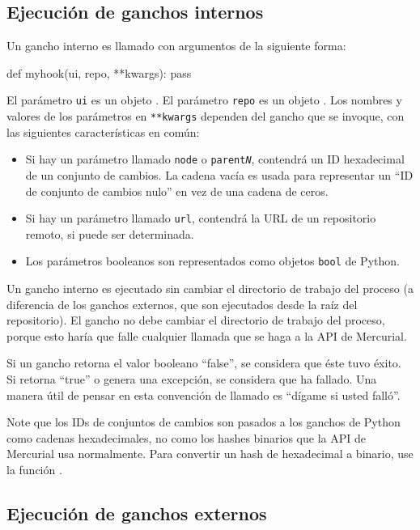 \subsection{Ejecución de ganchos internos}

Un gancho interno es llamado con argumentos de la siguiente forma:
\begin{codesample2}
  def myhook(ui, repo, **kwargs):
      pass
\end{codesample2}
El parámetro \texttt{ui} es un objeto .
El parámetro \texttt{repo} es un objeto
. Los nombres y
valores de los parámetros en \texttt{**kwargs} dependen del gancho que
se invoque, con las siguientes características en común:
\begin{itemize}
\item Si hay un parámetro llamado \texttt{node} o
  \texttt{parent\emph{N}}, contendrá un ID hexadecimal de un conjunto
  de cambios. La cadena vacía es usada para representar un
  ``ID de conjunto de cambios nulo'' en vez de una cadena de ceros.
\item Si hay un parámetro llamado \texttt{url}, contendrá la URL de un
  repositorio remoto, si puede ser determinada.
\item Los parámetros booleanos son representados como objetos
    \texttt{bool} de Python.
\end{itemize}

Un gancho interno es ejecutado sin cambiar el directorio de trabajo
del proceso (a diferencia de los ganchos externos, que son ejecutados
desde la raíz del repositorio). El gancho no debe cambiar el
directorio de trabajo del proceso, porque esto haría que falle
cualquier llamada que se haga a la API de Mercurial.

Si un gancho retorna el valor booleano ``false'', se
considera que éste tuvo éxito. Si retorna
``true'' o genera una excepción, se considera que
ha fallado. Una manera útil de pensar en esta convención de llamado es
``dígame si usted falló''.

Note que los IDs de conjuntos de cambios son pasados a los ganchos de
Python como cadenas hexadecimales, no como los hashes binarios que la
API de Mercurial usa normalmente. Para convertir un hash de
hexadecimal a binario, use la función .

\subsection{Ejecución de ganchos externos}

